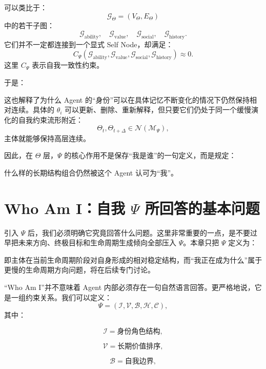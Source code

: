 可以类比于：
\[
\mathcal G_\Theta
=
(V_\Theta,E_\Theta)
\]
中的若干子图：
\[
\mathcal G_{\mathrm{ability}},
\quad
\mathcal G_{\mathrm{value}},
\quad
\mathcal G_{\mathrm{social}},
\quad
\mathcal G_{\mathrm{history}}.
\]
它们并不一定都连接到一个显式 Self Node，却满足：
\[
C_\Psi
\left(
\mathcal G_{\mathrm{ability}},
\mathcal G_{\mathrm{value}},
\mathcal G_{\mathrm{social}},
\mathcal G_{\mathrm{history}}
\right)
\approx 0.
\]
这里 $C_\Psi$ 表示自我一致性约束。

于是：
\begin{statementbox}
\centering
{}
\end{statementbox}

这也解释了为什么 Agent 的“身份”可以在具体记忆不断变化的情况下仍然保持相对连续。具体的 $\theta_i$ 可以更新、删除、重新解释，但只要它们仍处于同一个缓慢演化的自我约束流形附近：
\[
\Theta_t,\Theta_{t+\Delta}
\in
\mathcal N(\mathcal M_\Psi),
\]
主体就能够保持高层连续。

因此，在 $\Theta$ 层，$\Psi$ 的核心作用不是保存“我是谁”的一句定义，而是规定：
\begin{definition*}
什么样的长期结构组合仍然被这个 Agent 认可为“我”。
\end{definition*}


\section{Who Am I：自我 $\Psi$ 所回答的基本问题}

引入 $\Psi$ 后，我们必须明确它究竟回答什么问题。这里非常重要的一点，是不要过早把未来方向、终极目标和生命周期生成倾向全部压入 $\Psi$。本章只把 $\Psi$ 定义为：
\begin{statementbox}
\centering
{}
\end{statementbox}
即主体在当前生命周期阶段对自身形成的相对稳定结构，而“我正在成为什么”属于更慢的生命周期方向问题，将在后续专门讨论。

“Who Am I”并不意味着 Agent 内部必须存在一句自然语言回答。更严格地说，它是一组约束关系。我们可以定义：
\[
\Psi
=
\left(
\mathcal I,
\mathcal V,
\mathcal B,
\mathcal H,
\mathcal C
\right),
\]
其中：

\[
\mathcal I
=
\text{身份角色结构},
\]

\[
\mathcal V
=
\text{长期价值排序},
\]

\[
\mathcal B
=
\text{自我边界},
\]

